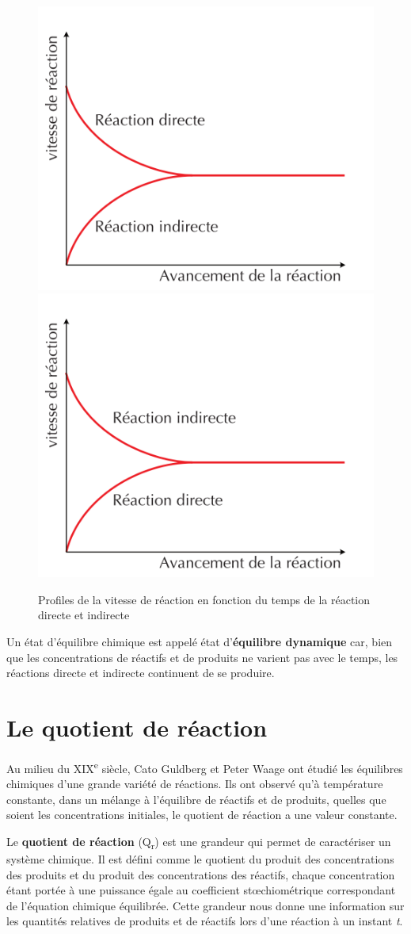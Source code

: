 \documentclass[
  11pt,
  a4paper,
  openany]{book}
\begin{document}
\begin{figure}

{\centering \includegraphics[width=0.33\linewidth]{images/equilibres-vitesses-1a} \includegraphics[width=0.33\linewidth]{images/equilibres-vitesses-1b} 

}

\caption{Profiles de la vitesse de réaction en fonction du temps de la réaction directe et indirecte}\label{fig:equilibres-vitesses-1}
\end{figure}

Un état d'équilibre chimique est appelé état d'\textbf{équilibre dynamique} car, bien que les concentrations de réactifs et de produits ne varient pas avec le temps, les réactions directe et indirecte continuent de se produire.

\section{Le quotient de réaction}\label{le-quotient-de-ruxe9action}

Au milieu du XIX\textsuperscript{e} siècle, Cato Guldberg et Peter Waage ont étudié les équilibres chimiques d'une grande variété de réactions. Ils ont observé qu'à température constante, dans un mélange à l'équilibre de réactifs et de produits, quelles que soient les concentrations initiales, le quotient de réaction a une valeur constante.

Le \textbf{quotient de réaction} (Q\textsubscript{r}) est une grandeur qui permet de caractériser un système chimique. Il est défini comme le quotient du produit des concentrations des produits et du produit des concentrations des réactifs, chaque concentration étant portée à une puissance égale au coefficient stœchiométrique correspondant de l'équation chimique équilibrée. Cette grandeur nous donne une information sur les quantités relatives de produits et de réactifs lors d'une réaction à un instant \emph{t}.
\end{document}

